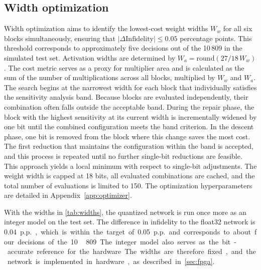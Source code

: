 \subsection{Width optimization} Width optimization aims to identify the lowest-cost weight widths $W_w$ for all six blocks simultaneously, ensuring that $|\Delta\mathrm{Infidelity}| \le 0.05$ percentage points. This threshold corresponds to approximately five decisions out of the 10\,809 in the simulated test set. Activation widths are determined by $W_a = \mathrm{round}(27/18\,W_w)$. The cost metric serves as a proxy for multiplier area and is calculated as the sum of the number of multiplications across all blocks, multiplied by $W_w$ and $W_a$. The search begins at the narrowest width for each block that individually satisfies the sensitivity analysis band. Because blocks are evaluated independently, their combination often falls outside the acceptable band. During the repair phase, the block with the highest sensitivity at its current width is incrementally widened by one bit until the combined configuration meets the band criterion. In the descent phase, one bit is removed from the block where this change saves the most cost. The first reduction that maintains the configuration within the band is accepted, and this process is repeated until no further single-bit reductions are feasible. This approach yields a local minimum with respect to single-bit adjustments. The weight width is capped at 18 bits, all evaluated combinations are cached, and the total number of evaluations is limited to 150. The optimization hyperparameters are detailed in Appendix~\ref{app:optimizer}.

With the widths in \cref{tab:widths}, the quantized network is run once more as an integer model on the test set. The difference in infidelity to the float32 network is \SI{0.04}{p.p.}, which is within the target of \SI{0.05}{p.p.} and corresponds to about four decisions of the 10\,809. The integer model also serves as the bit-accurate reference for the hardware. The widths are therefore fixed, and the network is implemented in hardware, as described in \cref{sec:fpga}.

